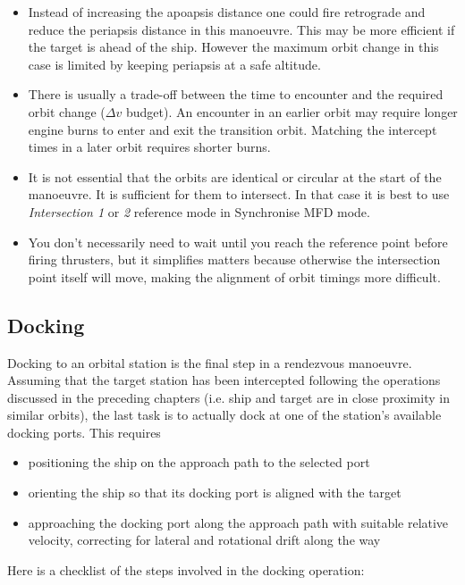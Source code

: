 \documentclass[Orbiter User Manual.tex]{subfiles}
\begin{document}
\begin{itemize}
	\item Instead of increasing the apoapsis distance one could fire retrograde
		and reduce the periapsis distance in this manoeuvre. This may be more
		efficient if the target is ahead of the ship. However the maximum orbit
		change in this case is limited by keeping periapsis at a safe altitude.
	\item There is usually a trade-off between the time to encounter and the
		required orbit change ($\Delta v$ budget). An encounter in an earlier
		orbit may require longer engine burns to enter and exit the transition
		orbit. Matching the intercept times in a later orbit requires shorter
		burns.
	\item It is not essential that the orbits are identical or circular at the
		start of the manoeuvre. It is sufficient for them to intersect. In that
		case it is best to use \emph{Intersection 1} or \emph{2} reference mode
		in Synchronise MFD mode.
	\item You don't necessarily need to wait until you reach the reference point
		before firing thrusters, but it simplifies matters because otherwise the
		intersection point itself will move, making the alignment of orbit
		timings more difficult.
\end{itemize}


\subsection{Docking}
\label{ssec:basic_docking}
Docking to an orbital station is the final step in a rendezvous manoeuvre.
Assuming that the target station has been intercepted following the operations
discussed in the preceding chapters (i.e. ship and target are in close proximity
in similar orbits), the last task is to actually dock at one of the station's
available docking ports. This requires

\begin{itemize}
	\item positioning the ship on the approach path to the selected port
	\item orienting the ship so that its docking port is aligned with the target
	\item approaching the docking port along the approach path with suitable
		relative velocity, correcting for lateral and rotational drift along the
		way
\end{itemize}

Here is a checklist of the steps involved in the docking operation:
\end{document}
